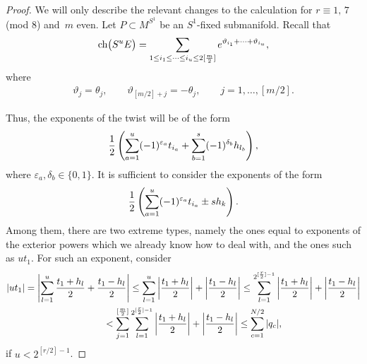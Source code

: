 \documentclass[pdftex]{sigma}
\newcommand{\ch}{\mbox{\rm ch}}
\numberwithin{equation}{section}
\begin{document}
\begin{proof}
We will only describe the relevant changes to the calculation for $r\equiv 1,\, 7$ (mod 8) and~$m$ even. Let $P\subset M^{S^1}$ be an $S^1$-f\/ixed submanifold. Recall that
\begin{gather*}
 \ch\big(S^uE\big) = \sum_{1\leq i_1\leq\dots\leq i_u\leq 2[\frac{m}{2}]}e^{\vartheta_{i_1} +\dots+\vartheta_{i_u}},
\end{gather*}
where
\begin{gather*}
 \vartheta_j = \theta_j,\qquad \vartheta_{[m/2]+j} = -\theta_j, \qquad j=1,\dots,[m/2].
\end{gather*}

Thus, the exponents of the twist will be of the form
 \begin{gather*}{1\over 2}\left(\sum_{a=1}^u (-1)^{\varepsilon_a}t_{i_a}+\sum_{b=1}^s (-1)^{\delta_b}h_{l_b}\right),\end{gather*}
where $\varepsilon_a,\delta_b\in \{ 0,1 \}$. It is suf\/f\/icient to consider the exponents of the form
\begin{gather*}{1\over 2}\left(\sum_{a=1}^u (-1)^{\varepsilon_a}t_{i_a}\pm sh_k\right).\end{gather*}
Among them, there are two extreme types, namely the ones equal to exponents of the exterior powers which we already know how to deal with, and the ones such as $u t_1$. For such an exponent, consider
\begin{gather*}
 |ut_1| = \left|\sum_{l=1}^u{t_1+h_l\over 2} + {t_1-h_l\over 2}\right|
 \leq \sum_{l=1}^u\left|{t_1+h_l\over 2}\right| + \left|{t_1-h_l\over 2}\right|
\leq \sum_{l=1}^{2^{[{r\over 2}]-1}}\left|{t_1+h_l\over 2}\right| + \left|{t_1-h_l\over 2}\right|\\
\hphantom{|ut_1|}{} < \sum_{j=1}^{[{m\over 2}]}\sum_{l=1}^{2^{[{r\over 2}]-1}}\left|{t_1+h_l\over 2}\right| + \left|{t_1-h_l\over 2}\right|
\leq \sum_{c=1}^{N/2} |q_c|,
\end{gather*}
if $u<2^{[r/2]-1}$.
\end{proof}
\end{document}
